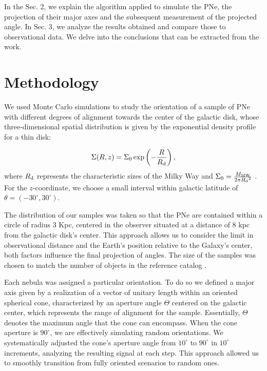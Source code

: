 \documentclass[baaa]{baaa}
\begin{document}
In the Sec. 2, we explain the algorithm applied to simulate the PNe, the projection of their major axes and the subsequent measurement of the projected angle. In Sec. 3, we analyze the results obtained and compare those to observational data. We delve into the conclusions that can be extracted from the work.

\section{Methodology}

We used Monte Carlo simulations to study the orientation of a sample of PNe with different degrees of alignment towards the center of the galactic disk, whose three-dimensional spatial distribution is given by the exponential density profile for a thin disk:

\begin{equation}
    \Sigma(R,z) = \Sigma_0 \exp\left(-\frac{R}{R_\textnormal{d}}\right),
\end{equation}
where $R_\textnormal{d}$ represents the characteristic sizes of the Milky Way and $\Sigma_0 =  \frac{M_\textnormal{MW} }{2 \pi {R_\textnormal{d}}^2 }$ \citep{mo}. For the $z$-coordinate, we choose a small interval within galactic latitude of $\theta = (-30^\circ, 30^\circ)$. 

The distribution of our samples was taken so that the PNe are contained within a circle of radius 3 Kpc, centered in the observer situated at a distance of 8 kpc from the galactic disk's center. This approach allows us to consider the limit in observational distance and the Earth's position relative to the Galaxy's center, both factors influence the final projection of angles. The size of the samples was chosen to match the number of objects in the reference catalog \citep{2008yCat..61200380W}. 
 
Each nebula was assigned a particular orientation. To do so we defined a major axis given by a realization of a vector of unitary length within an oriented spherical cone, characterized by an aperture angle $\Theta$ centered on the galactic center, which represents the range of alignment for the sample. Essentially, $\Theta$ denotes the maximum angle that the cone can encompass. When the cone aperture is $90^\circ$, we are effectively simulating random orientations. We systematically adjusted the cone's aperture angle from $10^\circ$ to $90^\circ$ in $10^\circ$ increments, analyzing the resulting signal at each step. This approach allowed us to smoothly transition from fully oriented scenarios to random ones.
\end{document}
